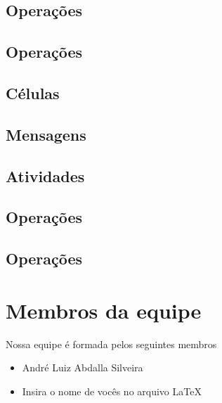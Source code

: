 \documentclass[11pt]{article}
\begin{document}
        \subsection{Operações}
        \subsection{Operações}
        \subsection{Células}
        \subsection{Mensagens}
        \subsection{Atividades}
        \subsection{Operações}
        \subsection{Operações}


    \section[Equipe]{Membros da equipe}

    Nossa equipe é formada pelos seguintes membros
    \begin{itemize}
        \item André Luiz Abdalla Silveira
        \item Insira o nome de vocês no arquivo \LaTeX
    \end{itemize}
\end{document}
